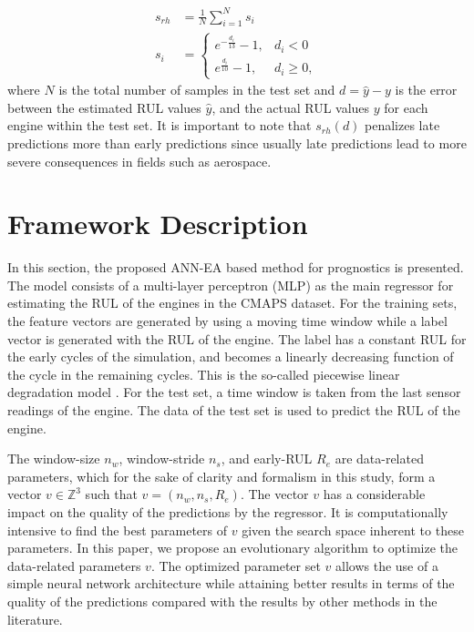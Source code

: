\documentclass[preprint,12pt]{elsarticle}%
\begin{document}
\begin{align}
s_{rh}  &  = \frac{1}{N} \sum_{i=1}^{N}{s_{i}}\nonumber\\
s_{i}  &  =
\begin{cases}
e^{-\frac{d_{i}}{13}} - 1, & d_{i} < 0\\
e^{\frac{d_{i}}{10}} - 1, & d_{i} \geq0,
\end{cases}
\label{eq:rhs}%
\end{align}
where $N$ is the total number of samples in the test set and $d = \hat{y} - y$
is the error between the estimated RUL values $\hat{y}$, and the actual RUL
values $y$ for each engine within the test set. It is important to note that
$s_{rh}(d)$ penalizes late predictions more than early predictions since
usually late predictions lead to more severe consequences in fields such as aerospace.

\section{Framework Description}

\label{sec:method}

In this section, the proposed ANN-EA based method for prognostics is
presented. The model consists of a multi-layer perceptron (MLP) as the main
regressor for estimating the RUL of the engines in the CMAPS dataset. For the
training sets, the feature vectors are generated by using a moving time window
while a label vector is generated with the RUL of the engine. The label has a
constant RUL for the early cycles of the simulation, and becomes a linearly
decreasing function of the cycle in the remaining cycles. This is the
so-called piecewise linear degradation model \cite{Ramasso2014}. For the test
set, a time window is taken from the last sensor readings of the engine. The
data of the test set is used to predict the RUL of the engine.

The window-size $n_{w}$, window-stride $n_{s}$, and early-RUL $R_{e}$ are
data-related parameters, which for the sake of clarity and formalism in this
study, form a vector $v \in\mathbb{Z}^{3}$ such that $v = (n_{w}, n_{s},
R_{e})$. The vector $v$ has a considerable impact on the quality of the
predictions by the regressor. It is computationally intensive to find the best
parameters of $v$ given the search space inherent to these parameters. In this
paper, we propose an evolutionary algorithm to optimize the data-related
parameters $v$. The optimized parameter set $v$ allows the use of a simple
neural network architecture while attaining better results in terms of the
quality of the predictions compared with the results by other methods in the literature.
\end{document}
